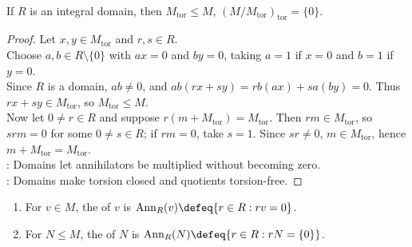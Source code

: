 \begin{proposition} \label{prop:torsion-submodule-over-domain} \\
If $R$ is an integral domain, then $M_{\operatorname{tor}}\leq M$, $(M/M_{\operatorname{tor}})_{\operatorname{tor}}=\{0\}$.
\begin{proof}
Let $x,y\in M_{\operatorname{tor}}$ and $r,s\in R$.\\
Choose $a,b\in R\setminus\{0\}$ with $ax=0$ and $by=0$, taking $a=1$ if $x=0$ and $b=1$ if $y=0$.\\
Since $R$ is a domain, $ab\neq0$, and $ab(rx+sy)=rb(ax)+sa(by)=0$. Thus $rx+sy\in M_{\operatorname{tor}}$, so $M_{\operatorname{tor}}\leq M$.\\
Now let $0\neq r\in R$ and suppose $r(m+M_{\operatorname{tor}})=M_{\operatorname{tor}}$. Then $rm\in M_{\operatorname{tor}}$, so $srm=0$ for some $0\neq s\in R$; if $rm=0$, take $s=1$. Since $sr\neq0$, $m\in M_{\operatorname{tor}}$, hence $m+M_{\operatorname{tor}}=M_{\operatorname{tor}}$.\\
: Domains let annihilators be multiplied without becoming zero.\\
: Domains make torsion closed and quotients torsion-free.
\end{proof}
\end{proposition}

\begin{definition} \label{def:module-annihilator} 
\begin{enumerate}[label=(\roman*)]
\setlength{\itemsep}{0pt}
\item For $v\in M$, the  of $v$ is $\operatorname{Ann}_R(v)\defeq\{r\in R:rv=0\}$.
\item For $N\leq M$, the  of $N$ is $\operatorname{Ann}_R(N)\defeq\{r\in R:rN=\{0\}\}$.
\end{enumerate}
\end{definition}

